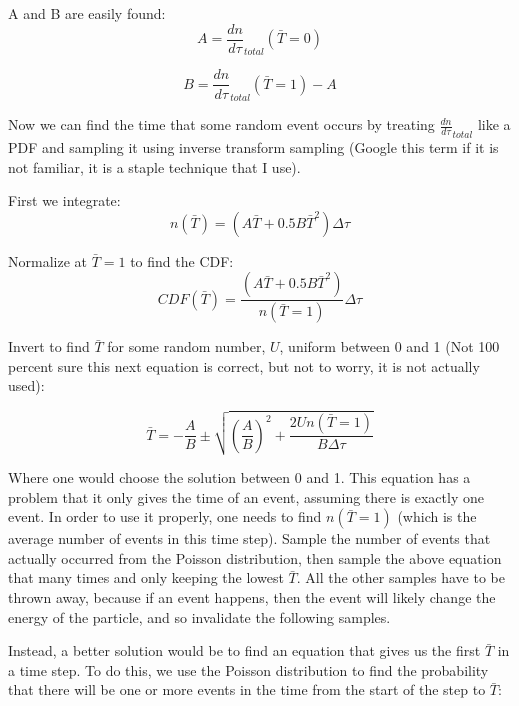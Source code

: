 \documentclass[]{article}
\begin{document}
A and B are easily found:
\begin{equation}
A=\frac{dn}{d\tau}_{total}(\bar{T}=0)
\end{equation}

\begin{equation}
B=\frac{dn}{d\tau}_{total}(\bar{T}=1)-A
\end{equation}

Now we can find the time that some random event occurs by treating $\frac{dn}{d\tau}_{total}$ like a PDF and sampling it using inverse transform sampling (Google this term if it is not familiar, it is a staple technique that I use). 

First we integrate:
\begin{equation}
n(\bar{T})=\left( A\bar{T}+0.5B\bar{T}^2\right) \Delta \tau
\end{equation}

Normalize at $\bar{T}=1$ to find the CDF:
\begin{equation}
CDF(\bar{T})=\frac{\left( A\bar{T}+0.5B\bar{T}^2\right)}{n(\bar{T}=1)} \Delta \tau
\end{equation}

Invert to find $\bar{T}$ for some random number, $U$, uniform between 0 and 1 (Not 100 percent sure this next equation is correct, but not to worry, it is not actually used):

\begin{equation}
\bar{T}=-\frac{A}{B}  \pm  \sqrt{  \left( \frac{A}{B} \right)^2  + \frac{2Un(\bar{T}=1)}{B \Delta \tau }  }
\end{equation}

Where one would choose the solution between 0 and 1. This equation has a problem that it only gives the time of an event, assuming there is exactly one event. In order to use it properly, one needs to find $n(\bar{T}=1)$ (which is the average number of events in this time step). Sample the number of events that actually occurred from the Poisson distribution, then sample the above equation that many times and only keeping the lowest $\bar{T}$. All the other samples have to be thrown away, because if an event happens, then the event will likely change the energy of the particle, and so invalidate the following samples.

Instead, a better solution would be to find an equation that gives us the first $\bar{T}$ in a time step. To do this, we use the Poisson distribution to find the probability that there will be one or more events in the time from the start of the step to $\bar{T}$:
\end{document}
